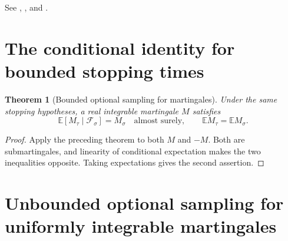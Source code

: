 \documentclass[11pt,oneside,openany]{book}
\theoremstyle{plain}
\newtheorem{theorem}{Theorem}[chapter]
\theoremstyle{definition}
\theoremstyle{remark}
\begin{document}
See \cite[Section 10.10 and Appendix A14]{Williams},
\cite[Theorem 9.12]{Kallenberg}, and \cite[Theorem 4.4.1]{Durrett}.

\section{The conditional identity for bounded stopping times}\label{p207:W40}

\begin{theorem}[Bounded optional sampling for martingales]
Under the same stopping hypotheses, a real integrable martingale
\(M\) satisfies
\[
 \mathbb E[M_\tau\mid\mathcal F_\sigma]=M_\sigma
       \quad\text{almost surely},
 \qquad
 \mathbb E M_\tau=\mathbb E M_\sigma .
\]
\end{theorem}
\begin{proof}
Apply the preceding theorem to both \(M\) and \(-M\). Both are
submartingales, and linearity of conditional expectation makes
the two inequalities opposite. Taking expectations gives the
second assertion.
\end{proof}

\section{Unbounded optional sampling for uniformly integrable martingales}\label{p207:W41}
\end{document}
